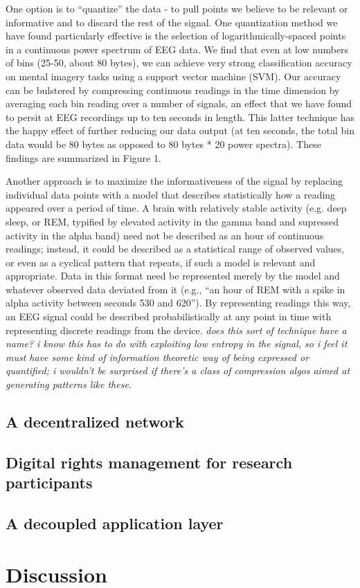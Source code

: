 \documentclass[a4paper,twoside]{article}
\begin{document}
One option is to ``quantize'' the data - to pull points we believe to be relevant or informative and to discard the rest of the signal. One quantization method we have found particularly effective is the selection of logarithmically-spaced points in a continuous power spectrum of EEG data. We find that even at low numbers of bins (25-50, about 80 bytes), we can achieve very strong classification accuracy on mental imagery tasks using a support vector machine (SVM). Our accuracy can be bulstered by compressing continuous readings in the time dimension by averaging each bin reading over a number of signals, an effect that we have found to persit at EEG recordings up to ten seconds in length. This latter technique has the happy effect of further reducing our data output (at ten seconds, the total bin data would be 80 bytes as opposed to 80 bytes * 20 power spectra). These findings are summarized in Figure 1.

Another approach is to maximize the informativeness of the signal by replacing individual data points with a model that describes statistically how a reading appeared over a period of time. A brain with relatively stable activity (e.g. deep sleep, or REM, typified by elevated activity in the gamma band and supressed activity in the alpha band) need not be described as an hour of continuous readings; instead, it could be described as a statistical range of observed values, or even as a cyclical pattern that repeats, if such a model is relevant and appropriate. Data in this format need be represented merely by the model and whatever observed data deviated from it (e.g., ``an hour of REM with a spike in alpha activity between seconds 530 and 620''). By representing readings this way, an EEG signal could be described probabilistically at any point in time with representing discrete readings from the device. \textit{does this sort of technique have a name? i know this has to do with exploiting low entropy in the signal, so i feel it must have some kind of information theoretic way of being expressed or quantified; i wouldn't be surprised if there's a class of compression algos aimed at generating patterns like these.}

\subsection{A decentralized network}

\subsection{Digital rights management for research participants}

\subsection{A decoupled application layer}





\section{Discussion}




% 
% 

\vfill

{\small
}

\vfill
\end{document}
